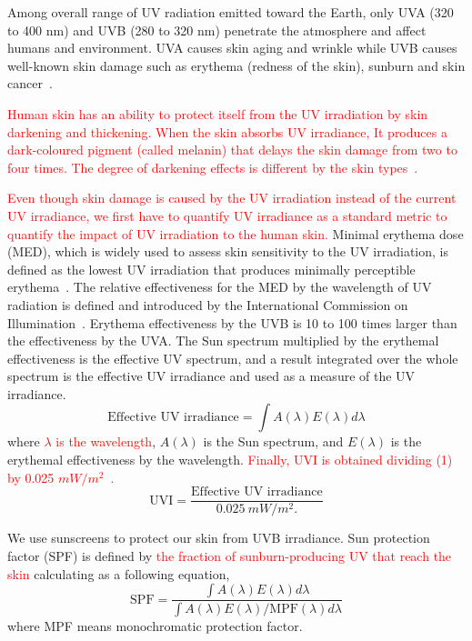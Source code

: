 \documentclass[journal]{IEEEtran}
\begin{document}
Among overall range of UV radiation emitted toward the Earth, only UVA (320 to 400 nm) and UVB (280 to 320 nm) penetrate the atmosphere and affect humans and environment. UVA causes skin aging and wrinkle while UVB causes well-known skin damage such as erythema (redness of the skin), sunburn and skin cancer~\cite{Matsumura:TAP04}.

\textcolor{red}{Human skin has an ability to protect itself from the UV irradiation by skin darkening and thickening. When the skin absorbs UV irradiance, It produces a dark-coloured pigment (called melanin) that delays the skin damage from two to four times. The degree of darkening effects is different by the skin types~\cite{Harrison:Method02}.}

\textcolor{red}{Even though skin damage is caused by the UV irradiation instead of the current UV irradiance, we first have to quantify UV irradiance as  a standard metric to quantify the impact of UV irradiation to the human skin.}
Minimal erythema dose (MED), which is widely used to assess skin sensitivity to the UV irradiation, is defined as the lowest UV irradiation that produces minimally perceptible erythema~\cite{Diffey:CPPM91}. The relative effectiveness for the MED by the wavelength of UV radiation is defined and introduced by the International Commission on Illumination~\cite{CIE}. Erythema effectiveness by the UVB is 10 to 100 times larger than the effectiveness by the UVA. The Sun spectrum multiplied by the erythemal effectiveness is the effective UV spectrum, and a result integrated over the whole spectrum is the effective UV irradiance and used as a measure of the UV irradiance.
\begin{equation}
\text{Effective~UV~irradiance} = \int A(\lambda)E(\lambda) d \lambda
 \end{equation}
where \textcolor{red}{$\lambda$ is the wavelength}, $A(\lambda)$ is the Sun spectrum, and $E(\lambda)$ is the erythemal effectiveness by the wavelength. \textcolor{red}{Finally, UVI is obtained dividing (1) by 0.025 $mW/m^2$~\cite{CIE}.}
\begin{equation}
\text{UVI}= \frac{\text{Effective~UV~irradiance}}{0.025~mW/m^2.}
 \end{equation}

We use sunscreens to protect our skin from UVB irradiance. Sun protection factor (SPF) is defined by \textcolor{red}{the fraction of sunburn-producing UV that reach the skin} calculating as a following equation,
\begin{equation}
\text{SPF} = \frac{\int A(\lambda)E(\lambda) d \lambda}{\int A(\lambda)E(\lambda) / \text{MPF}(\lambda) d \lambda}
 \end{equation}
where MPF means monochromatic protection factor.
\end{document}
